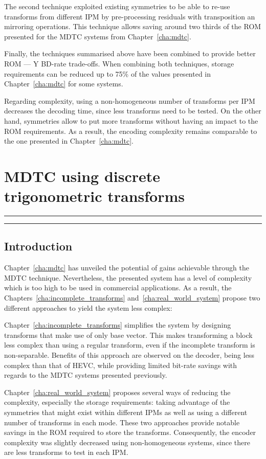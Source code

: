 \documentclass[11pt,a4paper,openright,twoside]{book}
\providecommand{\chaptertoc}{
	\startcontents[chapters]
	\hrule
	\vspace{1em}
	\printcontents[chapters]{}{1}{{\sf\large\bfseries Contents}}
	\hrule
}
\numberwithin{equation}{section} %
\numberwithin{figure}{section} %
\numberwithin{table}{section} %
\begin{document}
The second technique exploited existing symmetries to be able to re-use
transforms from different \ac{IPM} by pre-processing residuals with
transposition an mirroring operations.
This technique allows saving around two thirds of the \acs{ROM} presented for
the \ac{MDTC} systems from Chapter~\ref{cha:mdtc}.

Finally, the techniques summarised above have been combined to provide better
\acs{ROM} --- Y \ac{BD}-rate trade-offs.
When combining both techniques, storage requirements can be reduced up to 75\%
of the values presented in Chapter~\ref{cha:mdtc} for some systems.

Regarding complexity, using a non-homogeneous number of transforms per
\ac{IPM} decreases the decoding time, since less transforms need to be tested.
On the other hand, symmetries allow to put more transforms without having an
impact to the \acs{ROM} requirements.
As a result, the encoding complexity remains comparable to the one presented
in Chapter~\ref{cha:mdtc}.

\chapter{\acs{MDTC} using discrete trigonometric transforms}
\label{cha:dtt}
\chaptertoc

\section{Introduction}
\label{sec:introduction}

Chapter~\ref{cha:mdtc} has unveiled the potential of gains achievable through
the \ac{MDTC} technique.
Nevertheless, the presented system has a level of complexity which is too
high to be used in commercial applications.
As a result, the Chapters~\ref{cha:incomplete_transforms}
and~\ref{cha:real_world_system} propose two different approaches to yield the
system less complex:

Chapter~\ref{cha:incomplete_transforms} simplifies the system by designing
transforms that make use of only base vector.
This makes transforming a block less complex than using a regular transform,
even if the incomplete transform is non-separable.
Benefits of this approach are observed on the decoder, being less complex than
that of \ac{HEVC}, while providing limited bit-rate savings with regards to
the \ac{MDTC} systems presented previously.

Chapter~\ref{cha:real_world_system} proposes several ways of reducing the
complexity, especially the storage requirements:
taking advantage of the symmetries that might exist within different \acp{IPM}
as well as using a different number of transforms in each mode.
These two approaches provide notable savings in the \acs{ROM} required to
store the transforms.
Consequently, the encoder complexity was slightly decreased using
non-homogeneous systems, since there are less transforms to test in each
\ac{IPM}.
\end{document}
